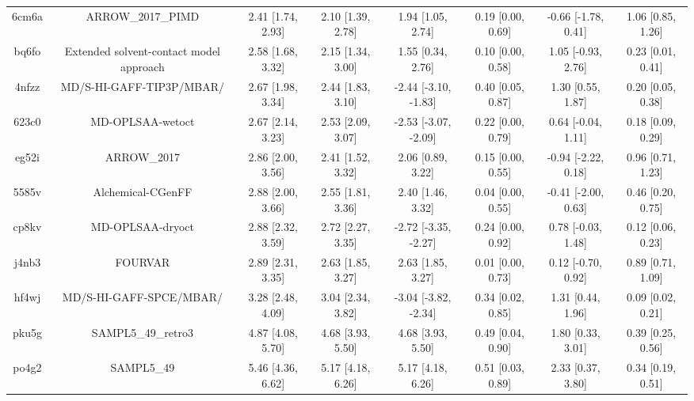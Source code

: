 \documentclass{article}
\begin{document}
\begin{center}
\begin{longtable}{|cccccccc|}
 6cm6a &                                  ARROW\_2017\_PIMD &  2.41 [1.74, 2.93] &  2.10 [1.39, 2.78] &     1.94 [1.05, 2.74] &  0.19 [0.00, 0.69] &  -0.66 [-1.78, 0.41] &     1.06 [0.85, 1.26] \\
 bq6fo &            Extended solvent-contact model approach &  2.58 [1.68, 3.32] &  2.15 [1.34, 3.00] &     1.55 [0.34, 2.76] &  0.10 [0.00, 0.58] &   1.05 [-0.93, 2.76] &     0.23 [0.01, 0.41] \\
 4nfzz &                           MD/S-HI-GAFF-TIP3P/MBAR/ &  2.67 [1.98, 3.34] &  2.44 [1.83, 3.10] &  -2.44 [-3.10, -1.83] &  0.40 [0.05, 0.87] &    1.30 [0.55, 1.87] &     0.20 [0.05, 0.38] \\
 623c0 &                                   MD-OPLSAA-wetoct &  2.67 [2.14, 3.23] &  2.53 [2.09, 3.07] &  -2.53 [-3.07, -2.09] &  0.22 [0.00, 0.79] &   0.64 [-0.04, 1.11] &     0.18 [0.09, 0.29] \\
 eg52i &                                        ARROW\_2017 &  2.86 [2.00, 3.56] &  2.41 [1.52, 3.32] &     2.06 [0.89, 3.22] &  0.15 [0.00, 0.55] &  -0.94 [-2.22, 0.18] &     0.96 [0.71, 1.23] \\
 5585v &                                  Alchemical-CGenFF &  2.88 [2.00, 3.66] &  2.55 [1.81, 3.36] &     2.40 [1.46, 3.32] &  0.04 [0.00, 0.55] &  -0.41 [-2.00, 0.63] &     0.46 [0.20, 0.75] \\
 cp8kv &                                   MD-OPLSAA-dryoct &  2.88 [2.32, 3.59] &  2.72 [2.27, 3.35] &  -2.72 [-3.35, -2.27] &  0.24 [0.00, 0.92] &   0.78 [-0.03, 1.48] &     0.12 [0.06, 0.23] \\
 j4nb3 &                                            FOURVAR &  2.89 [2.31, 3.35] &  2.63 [1.85, 3.27] &     2.63 [1.85, 3.27] &  0.01 [0.00, 0.73] &   0.12 [-0.70, 0.92] &     0.89 [0.71, 1.09] \\
 hf4wj &                            MD/S-HI-GAFF-SPCE/MBAR/ &  3.28 [2.48, 4.09] &  3.04 [2.34, 3.82] &  -3.04 [-3.82, -2.34] &  0.34 [0.02, 0.85] &    1.31 [0.44, 1.96] &     0.09 [0.02, 0.21] \\
 pku5g &                                 SAMPL5\_49\_retro3 &  4.87 [4.08, 5.70] &  4.68 [3.93, 5.50] &     4.68 [3.93, 5.50] &  0.49 [0.04, 0.90] &    1.80 [0.33, 3.01] &     0.39 [0.25, 0.56] \\
 po4g2 &                                         SAMPL5\_49 &  5.46 [4.36, 6.62] &  5.17 [4.18, 6.26] &     5.17 [4.18, 6.26] &  0.51 [0.03, 0.89] &    2.33 [0.37, 3.80] &     0.34 [0.19, 0.51] \\
\end{longtable}
\end{center}
\end{document}
